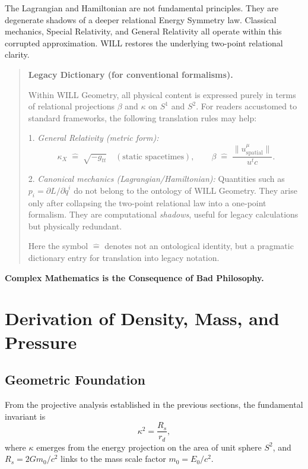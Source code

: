 \documentclass[12pt, a4paper]{article}
\begin{document}
\begin{tcolorbox}[colback=gray!5, colframe=black!80!black, title=Key Message]
The Lagrangian and Hamiltonian are not fundamental principles. They are 
degenerate shadows of a deeper relational Energy Symmetry law. Classical mechanics, 
Special Relativity, and General Relativity all operate within this corrupted 
approximation. WILL restores the underlying two-point relational clarity.
\end{tcolorbox}
\begin{quotation}
\textbf{Legacy Dictionary (for conventional formalisms).}  

Within WILL Geometry, all physical content is expressed purely in terms of relational projections $\beta$ and $\kappa$ on $S^1$ and $S^2$.  
For readers accustomed to standard frameworks, the following translation rules may help:  

1. \emph{General Relativity (metric form):}  
\[
\kappa_X \;\hat{=}\; \sqrt{-g_{tt}} \quad (\text{static spacetimes}), 
\qquad
\beta \;\hat{=}\; \frac{\|u^{\mu}_{\text{spatial}}\|}{u^t c}.
\]

2. \emph{Canonical mechanics (Lagrangian/Hamiltonian):}  
Quantities such as $p_i=\partial L/\partial \dot q^i$ do not belong to the ontology of WILL Geometry.  
They arise only after collapsing the two-point relational law into a one-point formalism.  
They are computational \emph{shadows}, useful for legacy calculations but physically redundant.  

Here the symbol $\hat{=}$ denotes not an ontological identity, 
but a pragmatic dictionary entry for translation into legacy notation.  
\end{quotation}
\begin{tcolorbox}[colback=gray!5, colframe=black!80!black, title=Summary]
\textbf{Complex Mathematics is the Consequence of Bad Philosophy.}
\end{tcolorbox}


\section{Derivation of Density, Mass, and Pressure}

\subsection{Geometric Foundation}
From the projective analysis established in the previous sections, the fundamental invariant is
\[
\kappa^2 = \frac{R_s}{r_d},
\]
where $\kappa$ emerges from the energy projection on the area of unit sphere $S^2$, and $R_s = 2Gm_0/c^2$ links to the mass scale factor $m_0 = E_0/c^2$.
\end{document}
